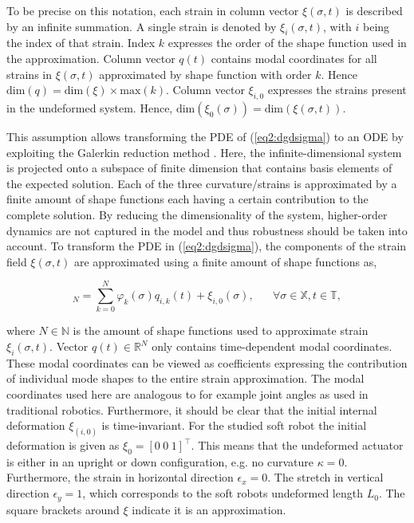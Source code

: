 To be precise on this notation, each strain in column vector $\xi(\sigma,t)$ is described by an infinite summation. A single strain is denoted by $\xi_i(\sigma,t)$, with $i$ being the index of that strain. Index $k$ expresses the order of the shape function used in the approximation. Column vector $q(t)$ contains modal coordinates for all strains in $\xi(\sigma,t)$ approximated by shape function with order $k$. Hence $\text{dim}(q) = \text{dim}(\xi) \times \text{max}(k)$. Column vector $\xi_{i,0}$ expresses the strains present in the undeformed system. Hence, $\text{dim}(\xi_0(\sigma)) = \text{dim}(\xi(\sigma,t))$.

This assumption allows transforming the PDE of (\ref{eq2:dgdsigma}) to an ODE by exploiting the Galerkin reduction method \cite{Galerkin}. Here, the infinite-dimensional system is projected onto a subspace of finite dimension that contains basis elements of the expected solution. Each of the three curvature/strains is approximated by a finite amount of shape functions each having a certain contribution to the complete solution. By reducing the dimensionality of the system, higher-order dynamics are not captured in the model and thus robustness should be taken into account. To transform the PDE in (\ref{eq2:dgdsigma}), the components of the strain field $\xi(\sigma,t)$ are approximated using a finite amount of shape functions as,

\begin{equation}
    [\xi_i(\sigma,t)]_N = \sum_{k=0}^N \varphi_k(\sigma)q_{i,k}(t) + \xi_{i,0}(\sigma), \hspace{20pt} \forall \sigma \in \mathbb{X}, t \in \mathbb{T},
    \label{eq2:strainapprox}
\end{equation}

where $N \in \mathbb{N}$ is the amount of shape functions used to approximate strain $\xi_i(\sigma,t)$. Vector $q(t) \in \mathbb{R}^N$ only contains time-dependent modal coordinates. These modal coordinates can be viewed as coefficients expressing the contribution of individual mode shapes to the entire strain approximation. The modal coordinates used here are analogous to for example joint angles as used in traditional robotics. Furthermore, it should be clear that the initial internal deformation $\xi_{(i,0)}$ is time-invariant. For the studied soft robot the initial deformation is given as $\xi_0 = [0 \hspace{3pt} 0 \hspace{3pt} 1]^\top$. This means that the undeformed actuator is either in an upright or down configuration, e.g. no curvature $\kappa = 0$. Furthermore, the strain in horizontal direction $\epsilon_x = 0$. The stretch in vertical direction $\epsilon_y = 1$, which corresponds to the soft robots undeformed length $L_0$. The square brackets around $\xi$ indicate it is an approximation. 

